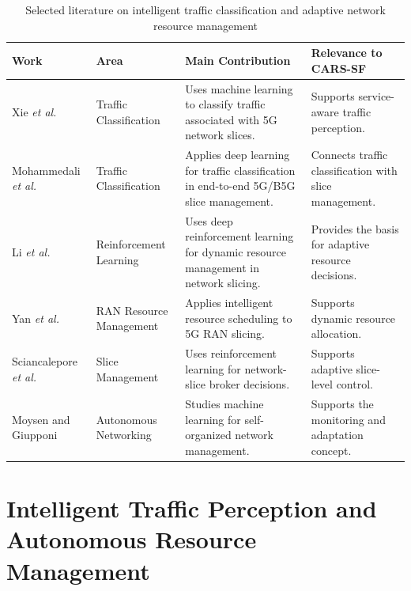\documentclass[12pt,a4paper]{report}
\begin{document}
\begin{table}[H]
	\centering
	\caption{Selected literature on intelligent traffic classification
		and adaptive network resource management}
	\label{tab:intelligent_network_management}
	\begin{tabular}{p{2.5cm} p{3.4cm} p{4.1cm} p{3.2cm}}
		\toprule
		\textbf{Work} &
		\textbf{Area} &
		\textbf{Main Contribution} &
		\textbf{Relevance to CARS-SF} \\
		\midrule
		
		Xie \textit{et al.} \cite{xie2021traffic} &
		Traffic Classification &
		Uses machine learning to classify traffic associated with 5G
		network slices. &
		Supports service-aware traffic perception. \\
		
		Mohammedali \textit{et al.} \cite{mohammedali2022traffic} &
		Traffic Classification &
		Applies deep learning for traffic classification in
		end-to-end 5G/B5G slice management. &
		Connects traffic classification with slice management. \\
		
		Li \textit{et al.} \cite{li2018drl} &
		Reinforcement Learning &
		Uses deep reinforcement learning for dynamic resource
		management in network slicing. &
		Provides the basis for adaptive resource decisions. \\
		
		Yan \textit{et al.} \cite{yan2019irs} &
		RAN Resource Management &
		Applies intelligent resource scheduling to 5G RAN slicing. &
		Supports dynamic resource allocation. \\
		
		Sciancalepore \textit{et al.} \cite{sciancalepore2019rlnsb} &
		Slice Management &
		Uses reinforcement learning for network-slice broker decisions. &
		Supports adaptive slice-level control. \\
		
		Moysen and Giupponi \cite{moysen2018selforganized} &
		Autonomous Networking &
		Studies machine learning for self-organized network management. &
		Supports the monitoring and adaptation concept. \\
		
		\bottomrule
	\end{tabular}
\end{table}


\section{Intelligent Traffic Perception and Autonomous Resource Management}
\label{sec:intelligent_network_management}
\end{document}

